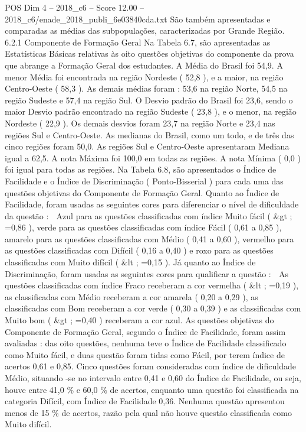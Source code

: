 \begin{textsample}{POS Dim 4 – 2018\_c6 – Score 12.00 – 2018\_c6/enade\_2018\_publi\_6e03840cda.txt}
São também apresentadas e comparadas as médias das subpopulações, caracterizadas por Grande Região. 6.2.1 Componente de Formação Geral Na Tabela 6.7, são apresentadas as Estatísticas Básicas relativas às oito questões objetivas do componente da prova que abrange a Formação Geral dos estudantes.
A Média do Brasil foi 54,9.
A menor Média foi encontrada na região Nordeste ( 52,8 ), e a maior, na região Centro-Oeste ( 58,3 ).
As demais médias foram : 53,6 na região Norte, 54,5 na região Sudeste e 57,4 na região Sul.
O Desvio padrão do Brasil foi 23,6, sendo o maior Desvio padrão encontrado na região Sudeste ( 23,8 ), e o menor, na região Nordeste ( 22,9 ).
Os demais desvios foram 23,7 na região Norte e 23,4 nas regiões Sul e Centro-Oeste.
As medianas do Brasil, como um todo, e de três das cinco regiões foram 50,0.
As regiões Sul e Centro-Oeste apresentaram Mediana igual a 62,5.
A nota Máxima foi 100,0 em todas as regiões.
A nota Mínima ( 0,0 ) foi igual para todas as regiões.
Na Tabela 6.8, são apresentados o Índice de Facilidade e o Índice de Discriminação ( Ponto-Bisserial ) para cada uma das questões objetivas do Componente de Formação Geral.
Quanto ao Índice de Facilidade, foram usadas as seguintes cores para diferenciar o nível de dificuldade da questão :  Azul para as questões classificadas com índice Muito fácil ( \&gt ; =0,86 ), verde para as questões classificadas com índice Fácil ( 0,61 a 0,85 ), amarelo para as questões classificadas com Médio ( 0,41 a 0,60 ), vermelho para as questões classificadas com Difícil ( 0,16 a 0,40 ) e roxo para as questões classificadas com Muito difícil ( \&lt ; =0,15 ).
Já quanto ao Índice de Discriminação, foram usadas as seguintes cores para qualificar a questão :  As questões classificadas com índice Fraco receberam a cor vermelha ( \&lt ; =0,19 ), as classificadas com Médio receberam a cor amarela ( 0,20 a 0,29 ), as classificadas com Bom receberam a cor verde ( 0,30 a 0,39 ) e as classificadas com Muito bom ( \&gt ; =0,40 ) receberam a cor azul.
As questões objetivas do Componente de Formação Geral, segundo o Índice de Facilidade, foram assim avaliadas : das oito questões, nenhuma teve o Índice de Facilidade classificado como Muito fácil, e duas questão foram tidas como Fácil, por terem índice de acertos 0,61 e 0,85.
Cinco questões foram consideradas com índice de dificuldade Médio, situando -se no intervalo entre 0,41 e 0,60 do Índice de Facilidade, ou seja, houve entre 41,0 \% e 60,0 \% de acertos, enquanto uma questão foi classificada na categoria Difícil, com Índice de Facilidade 0,36.
Nenhuma questão apresentou menos de 15 \% de acertos, razão pela qual não houve questão classificada como Muito difícil.

\end{textsample}
